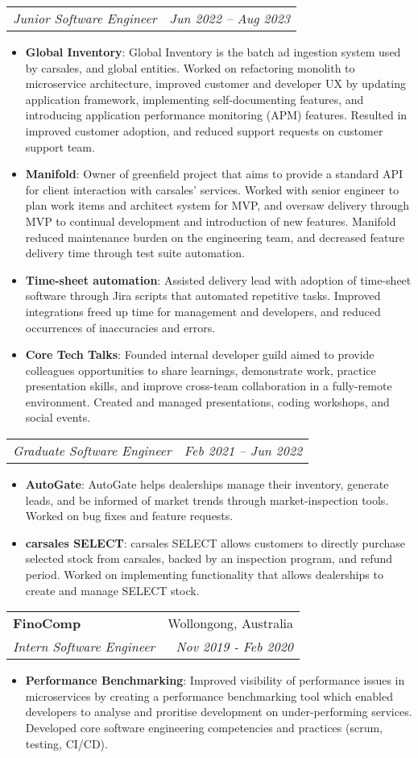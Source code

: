 \documentclass[letterpaper,11pt]{article}
\makeatletter
\newcommand{\resumeItem}[2]{
  \item\small{
    \textbf{#1}{: #2 \vspace{-2pt}}
  }
}
\newcommand{\resumeSubheading}[4]{
  \vspace{-1pt}\item
    \begin{tabular*}{0.97\textwidth}[t]{l@{\extracolsep{\fill}}r}
      \textbf{#1} & #2 \\
      \textit{\small#3} & \textit{\small #4} \\
    \end{tabular*}\vspace{-5pt}
}
\newcommand{\resumeSubSubheading}[2]{
    \begin{tabular*}{0.97\textwidth}{l@{\extracolsep{\fill}}r}
      \textit{\small#1} & \textit{\small #2} \\
    \end{tabular*}\vspace{-5pt}
}
\newcommand{\resumeItemListStart}{\begin{itemize}}
\newcommand{\resumeItemListEnd}{\end{itemize}\vspace{-5pt}}
\makeatother
\begin{document}
      \resumeSubSubheading
        {Junior Software Engineer}{Jun 2022 -- Aug 2023}
        \resumeItemListStart
          \resumeItem{Global Inventory}
            {Global Inventory is the batch ad ingestion system used by carsales, and global entities. Worked on refactoring monolith to microservice architecture, improved customer and developer UX by updating application framework, implementing self-documenting features, and introducing application performance monitoring (APM) features. Resulted in improved customer adoption, and reduced support requests on customer support team.}
          \resumeItem{Manifold}
            {Owner of greenfield project that aims to provide a standard API for client interaction with carsales’ services. Worked with senior engineer to plan work items and architect system for MVP, and oversaw delivery through MVP to continual development and introduction of new features. Manifold reduced maintenance burden on the engineering team, and decreased feature delivery time through test suite automation.}
          \resumeItem{Time-sheet automation}
            {Assisted delivery lead with adoption of time-sheet software through Jira scripts that automated repetitive tasks. Improved integrations freed up time for management and developers, and reduced occurrences of inaccuracies and errors.}
          \resumeItem{Core Tech Talks}
            {Founded internal developer guild aimed to provide colleagues opportunities to share learnings, demonstrate work, practice presentation skills, and improve cross-team collaboration in a fully-remote environment. Created and managed presentations, coding workshops, and social events.}
        \resumeItemListEnd

      \resumeSubSubheading
        {Graduate Software Engineer}{Feb 2021 -- Jun 2022}
        \resumeItemListStart
          \resumeItem{AutoGate}
            {AutoGate helps dealerships manage their inventory, generate leads, and be informed of market trends through market-inspection tools. Worked on bug fixes and feature requests.}
          \resumeItem{carsales SELECT}
            {carsales SELECT allows customers to directly purchase selected stock from carsales, backed by an inspection program, and refund period. Worked on implementing functionality that allows dealerships to create and manage SELECT stock.}
        \resumeItemListEnd


    \resumeSubheading
      {FinoComp}{Wollongong, Australia}
      {Intern Software Engineer}{Nov 2019 - Feb 2020}
      \resumeItemListStart
        \resumeItem{Performance Benchmarking}
          {Improved visibility of performance issues in microservices by creating a performance benchmarking tool which enabled developers to analyse and proritise development on under-performing services. Developed core software engineering competencies and practices (scrum, testing, CI/CD).}
      \resumeItemListEnd
\end{document}
